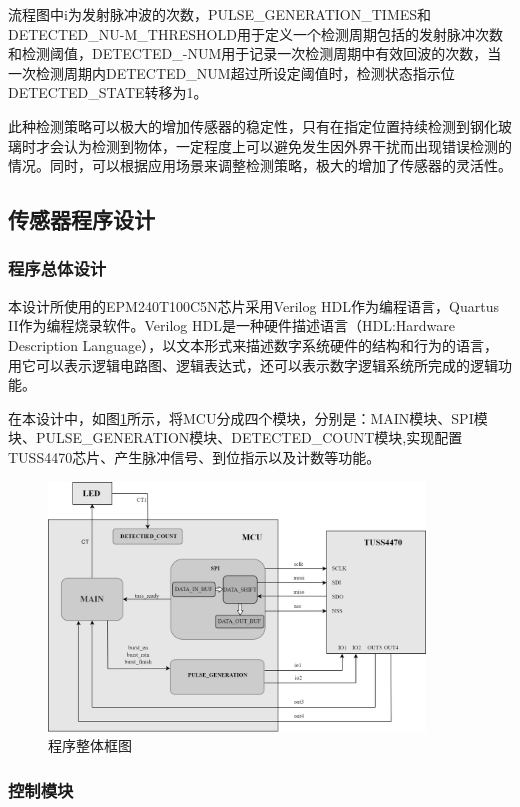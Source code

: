 流程图中i为发射脉冲波的次数，PULSE\_GENERATION\_TIMES和DETECTED\_NU-M\_THRESHOLD用于定义一个检测周期包括的发射脉冲次数和检测阈值，DETECTED\_-NUM用于记录一次检测周期中有效回波的次数，当一次检测周期内DETECTED\_NUM超过所设定阈值时，检测状态指示位DETECTED\_STATE转移为1。\par
此种检测策略可以极大的增加传感器的稳定性，只有在指定位置持续检测到钢化玻璃时才会认为检测到物体，一定程度上可以避免发生因外界干扰而出现错误检测的情况。同时，可以根据应用场景来调整检测策略，极大的增加了传感器的灵活性。


\subsection{传感器程序设计}
\subsubsection{程序总体设计}
本设计所使用的EPM240T100C5N芯片采用Verilog HDL作为编程语言，Quartus II作为编程烧录软件。Verilog HDL是一种硬件描述语言（HDL:Hardware Description Language），以文本形式来描述数字系统硬件的结构和行为的语言，用它可以表示逻辑电路图、逻辑表达式，还可以表示数字逻辑系统所完成的逻辑功能。\par
在本设计中，如图\ref{程序整体框图}所示，将MCU分成四个模块，分别是：MAIN模块、SPI模块、PULSE\_GENERATION模块、DETECTED\_COUNT模块,实现配置TUSS4470芯片、产生脉冲信号、到位指示以及计数等功能。
\begin{figure}[!h]
	\centering
	\includegraphics[width=10cm]{figure/Overall program block diagram.png}
	\caption{程序整体框图}
	\label{程序整体框图}
\end{figure}
\newpage
\subsubsection{控制模块}

